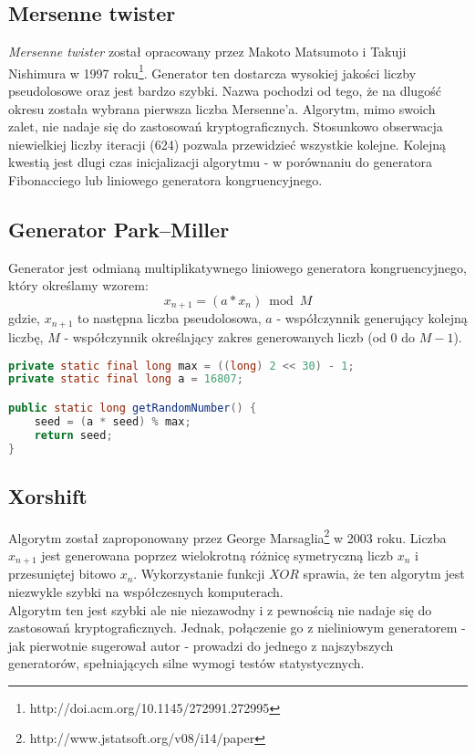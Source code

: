 \documentclass[a4paper, 11pt]{article} %
\begin{document}
\subsection{Mersenne twister}
\textit{Mersenne twister} został opracowany przez Makoto Matsumoto i Takuji Nishimura w 1997 roku\footnote{http://doi.acm.org/10.1145/272991.272995}. Generator ten dostarcza wysokiej jakości liczby pseudolosowe oraz jest bardzo szybki. Nazwa pochodzi od tego, że na dlugość okresu została wybrana pierwsza liczba Mersenne'a. Algorytm, mimo swoich zalet, nie nadaje się do zastosowań kryptograficznych. Stosunkowo obserwacja niewielkiej liczby iteracji (624) pozwala przewidzieć wszystkie kolejne. Kolejną kwestią jest dlugi czas inicjalizacji algorytmu - w porównaniu do generatora Fibonacciego lub liniowego generatora kongruencyjnego. 
\subsection{Generator Park–Miller}
Generator jest odmianą multiplikatywnego liniowego generatora kongruencyjnego, który określamy wzorem:
\[ x_{n+1} = (a * x_{n}) \bmod M \]
gdzie, $x_{n+1}$ to następna liczba pseudolosowa, $a$ - współczynnik generujący kolejną liczbę, $M$ - współczynnik określający zakres generowanych liczb (od $0$ do $M-1$).
\begin{lstlisting}[style=mystyle, language=java, frame=single, caption = Generowanie następnej liczby pseudolosowej przez algorytm Parka-Millera.]
private static final long max = ((long) 2 << 30) - 1;
private static final long a = 16807;

public static long getRandomNumber() {
    seed = (a * seed) % max;
    return seed;
}
\end{lstlisting}
\subsection{Xorshift}
Algorytm został zaproponowany przez George Marsaglia\footnote{http://www.jstatsoft.org/v08/i14/paper} w 2003 roku. Liczba $x_{n+1}$ jest generowana poprzez wielokrotną różnicę symetryczną liczb $x_{n}$ i przesuniętej bitowo $x_{n}$. Wykorzystanie funkcji $XOR$ sprawia, że ten algorytm jest niezwykle szybki na współczesnych komputerach.
\\
Algorytm ten jest szybki ale nie niezawodny i z pewnością nie nadaje się do zastosowań kryptograficznych. Jednak, połączenie go z nieliniowym generatorem - jak pierwotnie sugerował autor - prowadzi do jednego z najszybszych generatorów, spełniających silne wymogi testów statystycznych.
\end{document}
